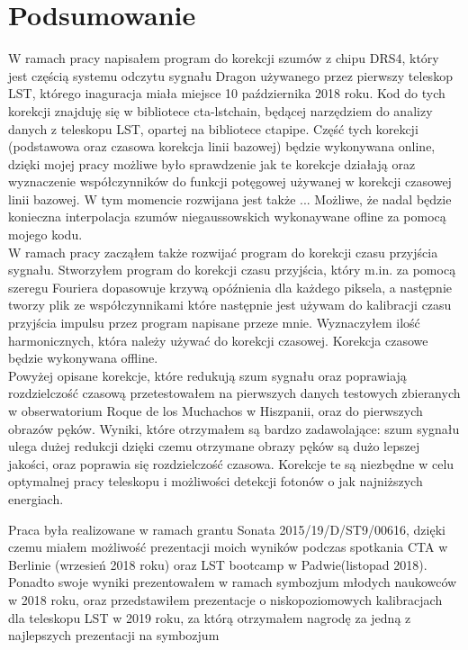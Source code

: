 \documentclass[a4paper,11pt,twoside]{article}
\begin{document}
\section{Podsumowanie}
W ramach pracy napisałem program do korekcji szumów z chipu DRS4, który jest częścią systemu odczytu sygnału Dragon używanego przez pierwszy teleskop LST, którego inaguracja miała miejsce 10 października 2018 roku. Kod do tych korekcji znajduję się w bibliotece cta-lstchain, będącej narzędziem do analizy danych z teleskopu LST, opartej na bibliotece ctapipe. Część tych korekcji (podstawowa oraz czasowa korekcja linii bazowej) będzie wykonywana online, dzięki mojej pracy możliwe było sprawdzenie jak te korekcje działają oraz wyznaczenie współczynników do funkcji potęgowej używanej w korekcji czasowej linii bazowej. W tym momencie rozwijana jest także ...
Możliwe, że nadal będzie konieczna interpolacja szumów niegaussowskich wykonaywane ofline za pomocą mojego kodu. \\
W ramach pracy zacząłem także rozwijać program do korekcji czasu przyjścia sygnału. Stworzyłem program do korekcji czasu przyjścia, który m.in. za pomocą szeregu Fouriera dopasowuje krzywą opóźnienia dla każdego piksela, a następnie tworzy plik ze współczynnikami które następnie jest używam do kalibracji czasu przyjścia impulsu przez program napisane przeze mnie. Wyznaczyłem ilość harmonicznych, która należy używać do korekcji czasowej. Korekcja czasowe będzie wykonywana offline.\\
Powyżej opisane korekcje, które redukują szum sygnału oraz poprawiają rozdzielczość czasową przetestowałem na pierwszych danych testowych zbieranych w obserwatorium Roque de los Muchachos w Hiszpanii, oraz do pierwszych obrazów pęków.  
Wyniki, które otrzymałem są bardzo zadawolające: szum sygnału ulega dużej redukcji dzięki czemu otrzymane obrazy pęków są dużo lepszej jakości, oraz poprawia się rozdzielczość czasowa. 
Korekcje te są niezbędne w celu optymalnej pracy teleskopu i możliwości detekcji fotonów o jak najniższych energiach. 

Praca była realizowane w ramach grantu Sonata 2015/19/D/ST9/00616, dzięki czemu miałem możliwość prezentacji moich wyników podczas spotkania CTA w Berlinie (wrzesień 2018 roku) oraz LST bootcamp w Padwie(listopad 2018). Ponadto swoje wyniki prezentowałem w ramach symbozjum młodych naukowców w 2018 roku, oraz przedstawiłem prezentacje o niskopoziomowych kalibracjach dla teleskopu LST w 2019 roku, za którą otrzymałem nagrodę za jedną z najlepszych prezentacji na symbozjum 
\end{document}
